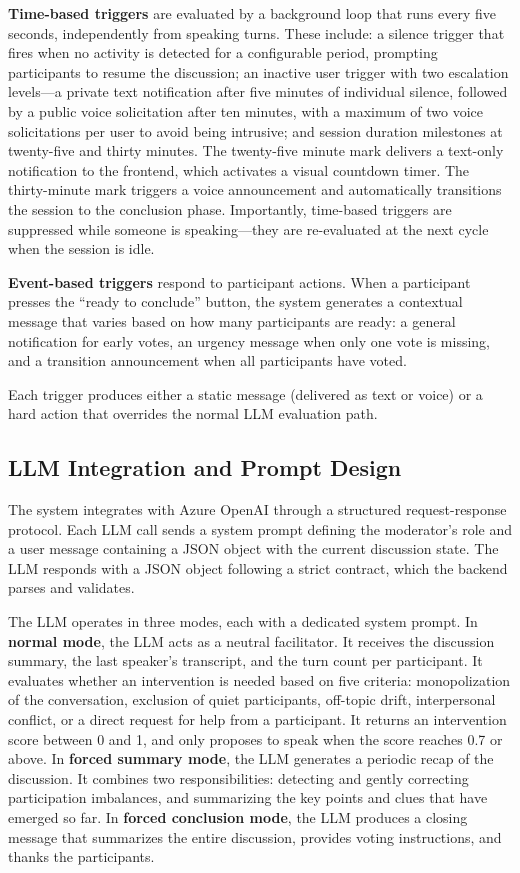 \textbf{Time-based triggers} are evaluated by a background loop that runs every five seconds, independently from speaking turns. These include: a silence trigger that fires when no activity is detected for a configurable period, prompting participants to resume the discussion; an inactive user trigger with two escalation levels---a private text notification after five minutes of individual silence, followed by a public voice solicitation after ten minutes, with a maximum of two voice solicitations per user to avoid being intrusive; and session duration milestones at twenty-five and thirty minutes. The twenty-five minute mark delivers a text-only notification to the frontend, which activates a visual countdown timer. The thirty-minute mark triggers a voice announcement and automatically transitions the session to the conclusion phase. Importantly, time-based triggers are suppressed while someone is speaking---they are re-evaluated at the next cycle when the session is idle.

\textbf{Event-based triggers} respond to participant actions. When a participant presses the ``ready to conclude'' button, the system generates a contextual message that varies based on how many participants are ready: a general notification for early votes, an urgency message when only one vote is missing, and a transition announcement when all participants have voted.

Each trigger produces either a static message (delivered as text or voice) or a hard action that overrides the normal LLM evaluation path.


\subsection{LLM Integration and Prompt Design}

The system integrates with Azure OpenAI through a structured request-response protocol. Each LLM call sends a system prompt defining the moderator's role and a user message containing a JSON object with the current discussion state. The LLM responds with a JSON object following a strict contract, which the backend parses and validates.

The LLM operates in three modes, each with a dedicated system prompt. In \textbf{normal mode}, the LLM acts as a neutral facilitator. It receives the discussion summary, the last speaker's transcript, and the turn count per participant. It evaluates whether an intervention is needed based on five criteria: monopolization of the conversation, exclusion of quiet participants, off-topic drift, interpersonal conflict, or a direct request for help from a participant. It returns an intervention score between 0 and 1, and only proposes to speak when the score reaches 0.7 or above. In \textbf{forced summary mode}, the LLM generates a periodic recap of the discussion. It combines two responsibilities: detecting and gently correcting participation imbalances, and summarizing the key points and clues that have emerged so far. In \textbf{forced conclusion mode}, the LLM produces a closing message that summarizes the entire discussion, provides voting instructions, and thanks the participants.

